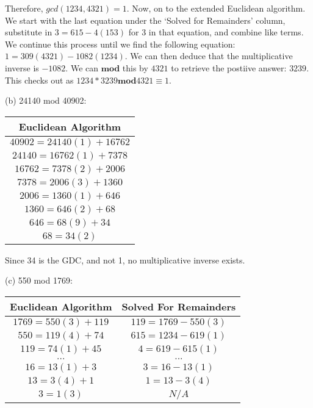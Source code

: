 \documentclass[11pt]{article}
\newcommand{\gap}{\vspace{3mm}}
\begin{document}
\gap{}

Therefore, $gcd(1234, 4321)=1$. Now, on to the extended Euclidean algorithm. We start with the last equation under the `Solved for Remainders' column, substitute in $3=615 - 4(153)$ for 3 in that equation, and combine like terms. We continue this process until we find the following equation: $1=309(4321)-1082(1234)$. We can then deduce that the multiplicative inverse is $-1082$. We can $\mathbf{mod}$ this by $4321$ to retrieve the postiive answer: $3239$. This checks out as $1234 * 3239 \mathbf{mod} 4321 \equiv 1$.

\gap{}

(b) 24140 mod 40902:\\

\gap{}

\begin{center}
\begin{tabular}{ |c| }
\hline
Euclidean Algorithm\\
\hline
$40902 = 24140(1) + 16762$\\
$24140 = 16762(1) + 7378$\\
$16762 = 7378(2) + 2006$\\
$7378 = 2006(3) + 1360$\\
$2006 = 1360(1) + 646$\\
$1360 = 646(2) + 68$\\
$646 = 68(9) + 34$\\
$68= 34(2)$\\
\hline
\end{tabular}
\end{center}

Since 34 is the GDC, and not 1, no multiplicative inverse exists.

\gap{}

(c) 550 mod 1769:\\

\gap{}

\begin{center}
\begin{tabular}{ |c|c| }
\hline
Euclidean Algorithm & Solved For Remainders\\
\hline
$1769 = 550(3) + 119$ & $119 = 1769 - 550(3)$\\
$550 = 119(4) + 74$ & $615 = 1234 - 619(1)$\\
$119 = 74(1) + 45$ & $4 = 619 - 615(1)$\\
$...$ & $...$\\
$16 = 13(1) + 3$ & $3 = 16 - 13(1)$\\
$13 = 3(4) + 1$ & $1 = 13 - 3(4)$\\
$3 = 1(3)$ & $N/A$\\
\hline
\end{tabular}
\end{center}
\end{document}
